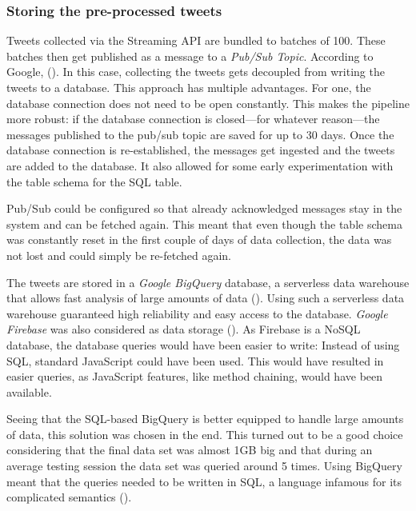 \subsubsection{Storing the pre-processed tweets}
Tweets collected via the Streaming API are bundled to batches of 100. These batches then get published as a message to a \emph{Pub/Sub Topic}. According to Google,  (\cite{googleWhatPubSub2020}). In this case, collecting the tweets gets decoupled from writing the tweets to a database. This approach has multiple advantages. For one, the database connection does not need to be open constantly. This makes the pipeline more robust: if the database connection is closed---for whatever reason---the messages published to the pub/sub topic are saved for up to 30 days. Once the database connection is re-established, the messages get ingested and the tweets are added to the database. It also allowed for some early experimentation with the table schema for the SQL table.

Pub/Sub could be configured so that already acknowledged messages stay in the system and can be fetched again. This meant that even though the table schema was constantly reset in the first couple of days of data collection, the data was not lost and could simply be re-fetched again.

The tweets are stored in a \emph{Google BigQuery} database, a serverless data warehouse that allows fast analysis of large amounts of data (\cite{googleBigQueryCloudData2020}). Using such a serverless data warehouse guaranteed high reliability and easy access to the database. \emph{Google Firebase} was also considered as data storage (\cite{googleCloudFirestoreFirebase2020}). As Firebase is a NoSQL database, the database queries would have been easier to write: Instead of using SQL, standard JavaScript could have been used. This would have resulted in easier queries, as JavaScript features, like method chaining, would have been available.

Seeing that the SQL-based BigQuery is better equipped to handle large amounts of data, this solution was chosen in the end. This turned out to be a good choice considering that the final data set was almost 1GB big and that during an average testing session the data set was queried around 5 times. Using BigQuery meant that the queries needed to be written in SQL, a language infamous for its complicated semantics (\cite{slutz1998massive}).

